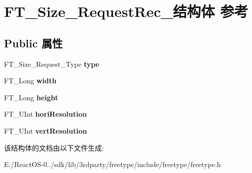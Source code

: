 \hypertarget{struct_f_t___size___request_rec__}{}\section{F\+T\+\_\+\+Size\+\_\+\+Request\+Rec\+\_\+结构体 参考}
\label{struct_f_t___size___request_rec__}
\subsection*{Public 属性}
\begin{DoxyCompactItemize}
\item 
\mbox{\label{struct_f_t___size___request_rec___a7644b04dd2b26c0698df558775320494}} 
F\+T\+\_\+\+Size\+\_\+\+Request\+\_\+\+Type {\bfseries type}
\item 
\mbox{\label{struct_f_t___size___request_rec___a7b044d36af318b053d5e3939eb0d5039}} 
F\+T\+\_\+\+Long {\bfseries width}
\item 
\mbox{\label{struct_f_t___size___request_rec___af8142450d8d032e1870d758cdcfa51a9}} 
F\+T\+\_\+\+Long {\bfseries height}
\item 
\mbox{\label{struct_f_t___size___request_rec___a3a85704d13561d9db53aa60f7805ec73}} 
F\+T\+\_\+\+U\+Int {\bfseries hori\+Resolution}
\item 
\mbox{\label{struct_f_t___size___request_rec___a86601c38d91064b6efe256a9e99c56f4}} 
F\+T\+\_\+\+U\+Int {\bfseries vert\+Resolution}
\end{DoxyCompactItemize}


该结构体的文档由以下文件生成\+:\begin{DoxyCompactItemize}
\item 
E\+:/\+React\+O\+S-\/0../sdk/lib/3rdparty/freetype/include/freetype/freetype.\+h\end{DoxyCompactItemize}
